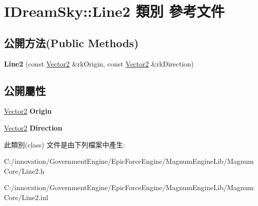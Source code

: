 \hypertarget{class_i_dream_sky_1_1_line2}{}\section{I\+Dream\+Sky\+:\+:Line2 類別 參考文件}
\label{class_i_dream_sky_1_1_line2}
\subsection*{公開方法(Public Methods)}
\begin{DoxyCompactItemize}
\item 
{\bfseries Line2} (const \hyperlink{class_i_dream_sky_1_1_vector2}{Vector2} \&rk\+Origin, const \hyperlink{class_i_dream_sky_1_1_vector2}{Vector2} \&rk\+Direction)\hypertarget{class_i_dream_sky_1_1_line2_a13512f97911498683031733fcc27e2e4}{}\label{class_i_dream_sky_1_1_line2_a13512f97911498683031733fcc27e2e4}

\end{DoxyCompactItemize}
\subsection*{公開屬性}
\begin{DoxyCompactItemize}
\item 
\hyperlink{class_i_dream_sky_1_1_vector2}{Vector2} {\bfseries Origin}\hypertarget{class_i_dream_sky_1_1_line2_a5da60562d7c904f8ae30ce23dae44f6f}{}\label{class_i_dream_sky_1_1_line2_a5da60562d7c904f8ae30ce23dae44f6f}

\item 
\hyperlink{class_i_dream_sky_1_1_vector2}{Vector2} {\bfseries Direction}\hypertarget{class_i_dream_sky_1_1_line2_afd7cc95c3a5c4eed5d41716000b6da14}{}\label{class_i_dream_sky_1_1_line2_afd7cc95c3a5c4eed5d41716000b6da14}

\end{DoxyCompactItemize}


此類別(class) 文件是由下列檔案中產生\+:\begin{DoxyCompactItemize}
\item 
C\+:/innovation/\+Government\+Engine/\+Epic\+Force\+Engine/\+Magnum\+Engine\+Lib/\+Magnum\+Core/Line2.\+h\item 
C\+:/innovation/\+Government\+Engine/\+Epic\+Force\+Engine/\+Magnum\+Engine\+Lib/\+Magnum\+Core/Line2.\+inl\end{DoxyCompactItemize}
